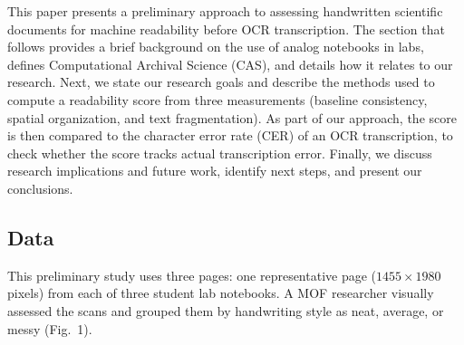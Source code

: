 %


This paper presents a preliminary approach to assessing handwritten scientific
documents for machine readability before OCR transcription. The section that
follows provides a brief background on the use of analog notebooks in labs,
defines Computational Archival Science (CAS), and details how it relates to our
research. Next, we state our research goals and describe the methods used to
compute a readability score from three measurements (baseline consistency,
spatial organization, and text fragmentation). As part of our approach, the
score is then compared to the character error rate (CER) of an OCR
transcription, to check whether the score tracks actual transcription error.
Finally, we discuss research implications and future work, identify next
steps, and present our conclusions.



\subsection{Data}

This preliminary study uses three pages: one representative page
($1455 \times 1980$ pixels) from each of three student lab notebooks. A MOF
researcher visually assessed the scans and grouped them by handwriting style
as neat, average, or messy (Fig.~1).

